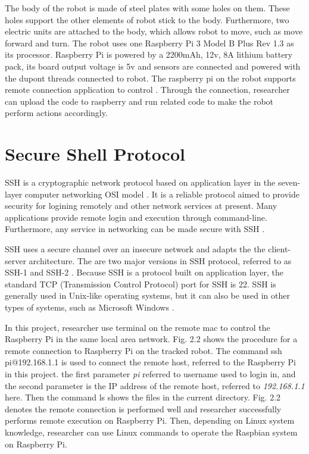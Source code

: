 \documentclass[11pt,times,oneside,openright,hardcopy]{eeereport}
\begin{document}
The body of the robot is made of steel plates with some holes on them. These holes support the other elements of robot stick to the body. 
Furthermore, two electric units are attached to the body, which allows robot to move, such as move forward and turn.
The robot uses one Raspberry Pi 3 Model B Plus Rev 1.3 as its processor. Raspberry Pi is powered by a 2200mAh, 12v, 8A lithium battery pack, its board output voltage is 5v 
and sensors are connected and powered with the dupont threads connected to robot.
The raspberry pi on the robot supports remote connection application to control \cite{Upton:2016wt}. 
Through the connection, researcher can upload the code to raspberry and run related code to make the robot perform actions accordingly.

\section{Secure Shell Protocol}
SSH is a  cryptographic network protocol based on application layer in the seven-layer computer networking OSI model \cite{Blank:2006tl}. It is a reliable protocol aimed to provide security for logining remotely and other network services at present.
Many applications provide remote login and execution through command-line. Furthermore, any service in networking can be made secure with SSH \cite{Anbalagan:2015tw}.

SSH uses a secure channel over an insecure network and adapts the the client-server architecture.
The are two major versions in SSH protocol, referred to as SSH-1 and SSH-2 \cite{Barrett:2005wf}. Because SSH is a protocol built on application layer, the standard TCP (Transmission Control Protocol) port for SSH is 22.
SSH is generally used in Unix-like operating systems, but it can also be used in other types of systems, such as Microsoft Windows \cite{Cowart:2003th}.

In this project, researcher use terminal on the remote mac to control the Raspberry Pi in the same local area network. Fig. 2.2 shows the procedure for a remote connection to Raspberry Pi on the tracked robot.
The command ssh pi@192.168.1.1 is used to connect the remote host, referred to the Raspberry Pi in this project. the first parameter \emph{pi} referred to username used to login in,
and the second parameter is the IP address of the remote host, referred to \emph{192.168.1.1} here.
Then the command ls shows the files in the current directory. Fig. 2.2 denotes the remote connection is performed well and researcher successfully performs remote execution on Raspberry Pi.
Then, depending on Linux system knowledge, researcher can use Linux commands to operate the Raspbian system on Raspberry Pi.
\end{document}
